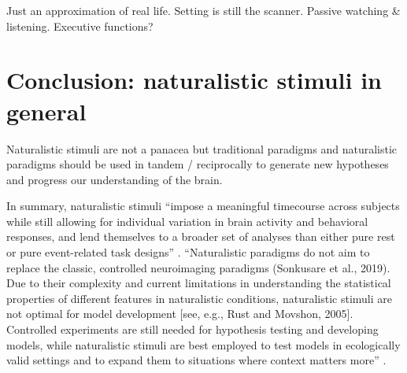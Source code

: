 %
Just an approximation of real life.
%
Setting is still the scanner.
%
Passive watching \& listening.
%
Executive functions?


\section{Conclusion: naturalistic stimuli in general}
%
Naturalistic stimuli are not a panacea but traditional paradigms and
naturalistic paradigms should be used in tandem / reciprocally to generate new
hypotheses and progress our understanding of the brain.


%
In summary, naturalistic stimuli ``impose a meaningful timecourse across
subjects while still allowing for individual variation in brain activity and
behavioral responses, and lend themselves to a broader set of analyses than
either pure rest or pure event-related task designs'' \citep{finn2017can}.
%
``Naturalistic paradigms do not aim to replace the classic, controlled
neuroimaging paradigms (Sonkusare et al., 2019). Due to their complexity and
current limitations in understanding the statistical properties of different
features in naturalistic conditions, naturalistic stimuli are not optimal for
model development [see, e.g., Rust and Movshon, 2005]. Controlled experiments
are still needed for hypothesis testing and developing models, while
naturalistic stimuli are best employed to test models in ecologically valid
settings and to expand them to situations where context matters
more'' \citep{saarimaki2021naturalistic}.
